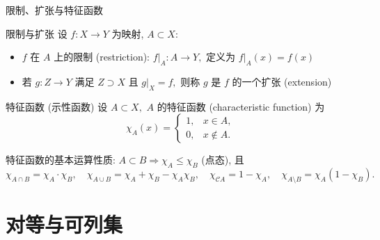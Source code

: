 \begin{frame}{限制、扩张与特征函数}

\begin{block}{限制与扩张}
设 $f: X \to Y$ 为映射, $A \subset X$:
\begin{itemize}
\item $f$ 在 $A$ 上的\alert{限制} (restriction): $f|_A: A \to Y,$ 定义为 $f|_A(x) = f(x)$
\item 若 $g: Z \to Y$ 满足 $Z \supset X$ 且 $g|_X = f,$ 则称 $g$ 是 $f$ 的一个\alert{扩张} (extension)
\end{itemize}
\end{block}

\pause
\vspace{0.5em}

\begin{block}{特征函数 (示性函数)}
设 $A \subset X,$ $A$ 的\alert{特征函数} (characteristic function) 为
\[
\chi_A(x) = \begin{cases} 1, & x \in A, \\ 0, & x \notin A. \end{cases}
\]
\end{block}

\pause
\vspace{0.3em}

特征函数的基本运算性质: $A \subset B \Rightarrow \chi_A \leqslant \chi_B$ (点态), 且
\[
\chi_{A \cap B} = \chi_A \cdot \chi_B, \quad
\chi_{A \cup B} = \chi_A + \chi_B - \chi_A \chi_B, \quad
\chi_{\mathscr{C} A} = 1 - \chi_A, \quad
\chi_{A \setminus B} = \chi_A (1 - \chi_B).
\]

\end{frame}


\section[可列集]{对等与可列集}


